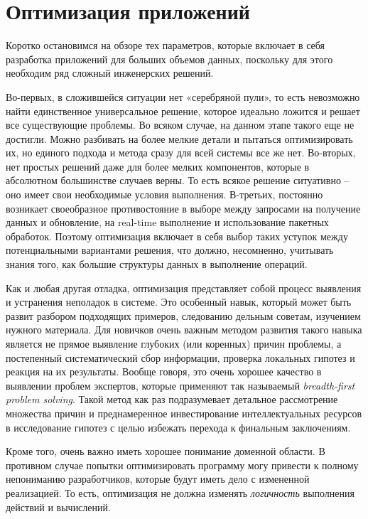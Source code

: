 \section{Оптимизация приложений \LB}
\label{sec:optimization}

Коротко остановимся на обзоре тех параметров, которые включает в себя разработка приложений для больших объемов данных, поскольку для этого необходим ряд сложный инженерских решений.

Во-первых, в сложившейся ситуации нет «серебряной пули», то есть невозможно найти единственное универсальное решение, которое идеально ложится и решает все существующие проблемы. Во всяком случае, на данном этапе такого еще не достигли. Можно разбивать на более мелкие детали и пытаться оптимизировать их, но единого подхода и метода сразу для всей системы все же нет. Во-вторых, нет простых решений даже для более мелких компонентов, которые в абсолютном большинстве случаев верны. То есть всякое решение ситуативно – оно имеет свои необходимые условия выполнения. В-третьих, постоянно возникает своеобразное противостояние в выборе между запросами на получение данных и обновление, на real-time выполнение и использование пакетных обработок. Поэтому оптимизация включает в себя выбор таких уступок между потенциальными вариантами решения, что должно, несомненно, учитывать знания того, как \logiql большие структуры данных в выполнение операций.

Как и любая другая отладка, оптимизация представляет собой процесс выявления и устранения неполадок в системе. Это особенный навык, который может быть развит разбором подходящих примеров, следованию дельным советам, изучением нужного материала. Для новичков очень важным методом развития такого навыка является не прямое выявление глубоких (или коренных) причин проблемы, а постепенный систематический сбор информации, проверка локальных гипотез и реакция на их результаты. Вообще говоря, это очень хорошее качество в выявлении проблем экспертов, которые применяют так называемый \emph{breadth-first problem solving}. Такой метод как раз подразумевает детальное рассмотрение множества причин и преднамеренное инвестирование интеллектуальных ресурсов в исследование гипотез с целью избежать перехода к финальным заключениям.

Кроме того, очень важно иметь хорошее понимание доменной области. В противном случае попытки оптимизировать программу могу привести к полному непониманию разработчиков, которые будут иметь дело с измененной реализацией. То есть, оптимизация не должна изменять \emph{логичность} выполнения действий и вычислений.












